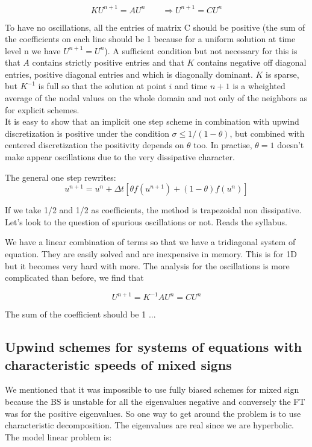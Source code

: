 \begin{equation}
K U^{n+1} = A U^n \qquad \Rightarrow U^{n+1}  = C U^{n}
\end{equation}

To have no oscillations, all the entries of matrix C should be positive (the sum of the coefficients on each line should be 1 because for a uniform solution at time level n we have $U^{n+1}=U^n$). A sufficient condition but not necessary for this is that $A$ contains strictly positive entries and that $K$ contains negative off diagonal entries,  positive diagonal entries and which is diagonally dominant. $K$ is sparse, but $K^{-1}$ is full so that the solution at point $i$ and time $n+1$ is a wheighted average of the nodal values on the whole domain and not only of the neighbors as for explicit schemes. \\

It is easy to show that an implicit one step scheme in combination with upwind discretization is positive under the condition $\sigma \leq 1/(1-\theta)$, but combined with centered discretization the positivity depends on $\theta$ too. In practise, $\theta = 1$ doesn't make  appear oscillations due to the very dissipative character. 

The general one step rewrites: 
\begin{equation}
u^{n+1} = u^n + \Delta t [\theta f(u^{n+1}) + (1-\theta) f(u^n)]
\end{equation}

If we take 1/2 and 1/2 as coefficients, the method is trapezoidal non dissipative. Let's look to the question of spurious oscillations or not. Reads the syllabus. 

We have a linear combination of terms so that we have a tridiagonal system of equation. They are easily solved and are inexpensive in memory. This is for 1D but it becomes very hard with more. The analysis for the oscillations is more complicated than before, we find that 

\begin{equation}
U^{n+1}= K^{-1}AU^n = CU^n
\end{equation}

The sum of the coefficient should be 1 ... 


\subsection{Upwind schemes for systems of equations with characteristic speeds of mixed signs}
We mentioned that it was impossible to use fully biased schemes for mixed sign because the BS is unstable for all the eigenvalues negative and conversely the FT was for the positive eigenvalues. So one way to get around the problem is to use characteristic decomposition. The eigenvalues are real since we are hyperbolic. The model linear problem is: 

